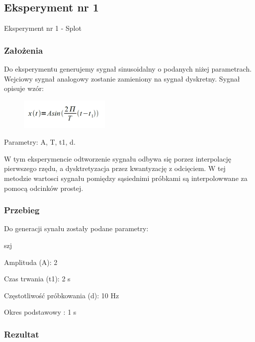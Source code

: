 \documentclass[12pt]{article}
\begin{document}
\subsection{Eksperyment nr 1}

Eksperyment nr 1 -  Splot\\


\subsubsection{Założenia}
Do eksperymentu generujemy sygnał sinusoidalny o podanych niżej parametrach. Wejciowy sygnał analogowy zostanie zamieniony na sygnał dyskretny.
Sygnał opisuje wzór:

\begin{figure}[h!]
 \centering
 \includegraphics[width=4.3cm]{SinWzor.PNG}
 \vspace{-0.3cm}
 \label{gw}
\end{figure}
Parametry: A, T, t1, d.

W tym eksperymencie odtworzenie sygnału odbywa się porzez interpolację pierwszego rzędu, a dysktretyzacja przez kwantyzację z odcięciem. W tej metodzie wartosci sygnału pomiędzy sąsiednimi próbkami są interpolowwane za pomocą odcinków prostej.

\subsubsection{Przebieg}
Do generacji synału zostały podane parametry:

\begin{labeling}{szj}
\item [Amplituda (A):] 2
\item [Czas trwania (t1):] 2 s
\item [Częstotliwość próbkowania (d): ] 10 Hz
\item [Okres podstawowy :] 1 s
\end{labeling}

\subsubsection{Rezultat}
\end{document}
